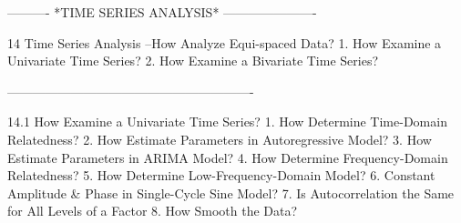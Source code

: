  
 
 
 
 
 
 
 
 
 
 
 
 
 
 
 
 
 
 
 
 
 
 
 
 
 
 
 
 
 
 
 
 
 
 
 
 
 
 
 
 
 
 
 
 
 
 
 
 
 
 
 
 
 
 
 
 
 
 
 
 
 
 
 
 
 
 
 
 
 
 
 
 
 
 
 
 
 
 
 
 
 
 
 
 
 
 
 
 
 
----------  *TIME SERIES ANALYSIS*  ----------------------
 
14
Time Series Analysis  --How Analyze Equi-spaced Data?
   1. How Examine a Univariate Time Series?
   2. How Examine a Bivariate  Time Series?
 
----------------------------------------------------------
 
14.1
How Examine a Univariate Time Series?
   1. How Determine Time-Domain Relatedness?
   2. How Estimate Parameters in Autoregressive Model?
   3. How Estimate Parameters in ARIMA Model?
   4. How Determine Frequency-Domain Relatedness?
   5. How Determine Low-Frequency-Domain Model?
   6. Constant Amplitude & Phase in Single-Cycle Sine Model?
   7. Is Autocorrelation the Same for All Levels of a Factor
   8. How Smooth the Data?
 
